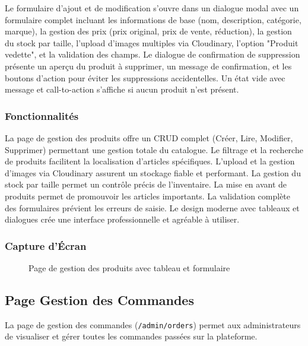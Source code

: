 \documentclass[12pt,a4paper]{article}
\begin{document}
Le formulaire d'ajout et de modification s'ouvre dans un dialogue modal avec un formulaire complet incluant les informations de base (nom, description, catégorie, marque), la gestion des prix (prix original, prix de vente, réduction), la gestion du stock par taille, l'upload d'images multiples via Cloudinary, l'option "Produit vedette", et la validation des champs. Le dialogue de confirmation de suppression présente un aperçu du produit à supprimer, un message de confirmation, et les boutons d'action pour éviter les suppressions accidentelles. Un état vide avec message et call-to-action s'affiche si aucun produit n'est présent.

\subsubsection{Fonctionnalités}

La page de gestion des produits offre un CRUD complet (Créer, Lire, Modifier, Supprimer) permettant une gestion totale du catalogue. Le filtrage et la recherche de produits facilitent la localisation d'articles spécifiques. L'upload et la gestion d'images via Cloudinary assurent un stockage fiable et performant. La gestion du stock par taille permet un contrôle précis de l'inventaire. La mise en avant de produits permet de promouvoir les articles importants. La validation complète des formulaires prévient les erreurs de saisie. Le design moderne avec tableaux et dialogues crée une interface professionnelle et agréable à utiliser.

\subsubsection{Capture d'Écran}

\begin{figure}[H]
    \centering
    \caption{Page de gestion des produits avec tableau et formulaire}
    \label{fig:admin-products}
\end{figure}

\subsection{Page Gestion des Commandes}

La page de gestion des commandes (\texttt{/admin/orders}) permet aux administrateurs de visualiser et gérer toutes les commandes passées sur la plateforme.
\end{document}
